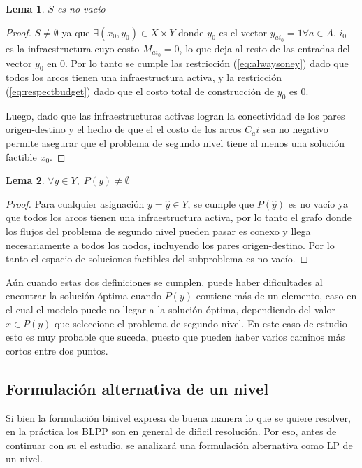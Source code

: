 \documentclass{article}
\newtheorem{lemma}{Lema}
\begin{document}
  \begin{lemma}$S$ es no vacío
  \end{lemma}

  \begin{proof}
    $S \neq \emptyset$ ya que $\exists (x_0, y_0) \in X \times Y$ donde $y_0$ es el vector $y_{ai_0} = 1 \forall a \in A$, $i_0$ es la infraestructura cuyo costo $M_{ai_0} = 0$, lo que deja al resto de las entradas del vector $y_0$ en $0$. Por lo tanto se cumple las restricción (\ref{eq:alwaysoney}) dado que todos los arcos tienen una infraestructura activa, y la restricción (\ref{eq:respectbudget}) dado que el costo total de construcción de $y_0$ es $0$.

    Luego, dado que las infraestructuras activas logran la conectividad de los pares origen-destino y el hecho de que el el costo de los arcos $C_ai$ sea no negativo permite asegurar que el problema de segundo nivel tiene al menos una solución factible $x_0$.
  \end{proof}

  \begin{lemma}$\forall y \in Y,\; P(y) \neq \emptyset$
  \end{lemma}

  \begin{proof}
    Para cualquier asignación $y = \hat{y} \in Y$, se cumple que $P(\hat{y})$ es no vacío ya que todos los arcos tienen una infraestructura activa, por lo tanto el grafo donde los flujos del problema de segundo nivel pueden pasar es conexo y llega necesariamente a todos los nodos, incluyendo los pares origen-destino. Por lo tanto el espacio de soluciones factibles del subproblema es no vacío. 
  \end{proof}

  Aún cuando estas dos definiciones se cumplen, puede haber dificultades al encontrar la solución óptima cuando $P(y)$ contiene más de un elemento, caso en el cual el modelo puede no llegar a la solución óptima, dependiendo del valor $x \in P(y)$ que seleccione el problema de segundo nivel. En este caso de estudio esto es muy probable que suceda, puesto que pueden haber varios caminos más cortos entre dos puntos.

  \subsection*{Formulación alternativa de un nivel}

  Si bien la formulación binivel expresa de buena manera lo que se quiere resolver, en la práctica los BLPP son en general de dificil resolución. Por eso, antes de continuar con su el estudio, se analizará una formulación alternativa como LP de un nivel.
\end{document}
